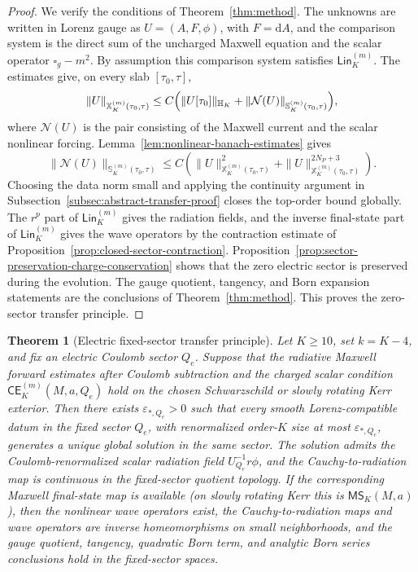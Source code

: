 \documentclass[11pt]{article}
\numberwithin{equation}{section}
\theoremstyle{plain}
\newtheorem{theorem}{Theorem}[section]
\theoremstyle{definition}
\theoremstyle{remark}
\newcommand{\dd}{\mathrm{d}}
\newcommand{\Lin}{\mathsf{Lin}}
\newcommand{\CElec}{\mathsf{CE}}
\newcommand{\MScat}{\mathsf{MS}}
\begin{document}
\begin{proof}
We verify the conditions of Theorem~\ref{thm:method}.  The unknowns are written in Lorenz gauge as \(U=(A,F,\phi)\), with \(F=\dd A\), and the comparison system is the direct sum of the uncharged Maxwell equation and the scalar operator \(\square_g-m^2\).  By assumption this comparison system satisfies \(\Lin_K^{(m)}\).  The estimates give, on every slab \([\tau_0,\tau]\),
\begin{equation}
 \|U\|_{\mathbb X_K^{(m)}(\tau_0,\tau)}
 \le C\Bigl(\|U[\tau_0]\|_{\mathbb H_K}
       +\|\mathcal N(U)\|_{\mathbb S_K^{(m)}(\tau_0,\tau)}\Bigr),
\end{equation}
where \(\mathcal N(U)\) is the pair consisting of the Maxwell current and the scalar nonlinear forcing.  Lemma~\ref{lem:nonlinear-banach-estimates} gives
\begin{equation}
 \|\mathcal N(U)\|_{\mathbb S_K^{(m)}(\tau_0,\tau)}
 \le C\left(\|U\|_{\mathbb X_K^{(m)}(\tau_0,\tau)}^2
        +\|U\|_{\mathbb X_K^{(m)}(\tau_0,\tau)}^{2N_P+3}\right).
\end{equation}
Choosing the data norm small and applying the continuity argument in Subsection~\ref{subsec:abstract-transfer-proof} closes the top-order bound globally.  The \(r^p\) part of \(\Lin_K^{(m)}\) gives the radiation fields, and the inverse final-state part of \(\Lin_K^{(m)}\) gives the wave operators by the contraction estimate of Proposition~\ref{prop:closed-sector-contraction}.  Proposition~\ref{prop:sector-preservation-charge-conservation} shows that the zero electric sector is preserved during the evolution.  The gauge quotient, tangency, and Born expansion statements are the conclusions of Theorem~\ref{thm:method}.  This proves the zero-sector transfer principle.
\end{proof}


\begin{theorem}[Electric fixed-sector transfer principle]\label{thm:electric-sector-transfer}
Let \(K\ge10\), set \(k=K-4\), and fix an electric Coulomb sector \(Q_e\).  Suppose that the radiative Maxwell forward estimates after Coulomb subtraction and the charged scalar condition \(\CElec^{(m)}_K(M,a,Q_e)\) hold on the chosen Schwarzschild or slowly rotating Kerr exterior.  Then there exists \(\varepsilon_{*,Q_e}>0\) such that every smooth Lorenz-compatible datum in the fixed sector \(Q_e\), with renormalized order-\(K\) size at most \(\varepsilon_{*,Q_e}\), generates a unique global solution in the same sector.  The solution admits the Coulomb-renormalized scalar radiation field \(U_{Q_e}^{-1}r\phi\), and the Cauchy-to-radiation map is continuous in the fixed-sector quotient topology.  If the corresponding Maxwell final-state map is available (on slowly rotating Kerr this is \(\MScat_K(M,a)\)), then the nonlinear wave operators exist, the Cauchy-to-radiation maps and wave operators are inverse homeomorphisms on small neighborhoods, and the gauge quotient, tangency, quadratic Born term, and analytic Born series conclusions hold in the fixed-sector spaces.
\end{theorem}
\end{document}
